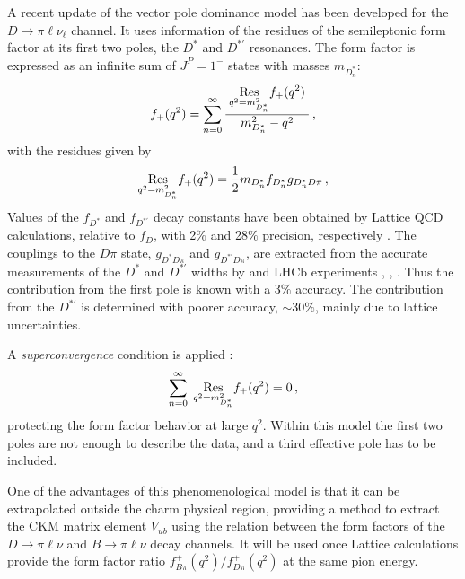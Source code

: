 A recent update of the vector pole dominance model has been developed for the $D \to \pi \ell \nu_\ell$ channel\cite{Becirevic:2014kaa}.
It uses information of the residues of the semileptonic form factor at its first two poles, the $D^\ast$ 
and $D^{\ast '}$ resonances.  
The form factor is expressed as an infinite sum of $J^P =1^-$ states with masses $m_{D^\ast_n}$: 
\begin{eqnarray}
f_+(q^2) = \sum_{n=0}^\infty { \; \displaystyle{\underset{q^2= m_{D^\ast_n}^2}{\rm Res}} f_+(q^2)\;\over m_{D^\ast_n}^2-q^2} \,,
\label{ThreePole}
\end{eqnarray}
with the residues given by 
\begin{eqnarray}
\displaystyle{\underset{q^2=m_{D_n^\ast}^2}{\rm Res}} f_+(q^2)= {1\over 2} m_{D_n^\ast} f_{D_n^\ast} g_{D_n^\ast D\pi}\,, 
\label{Residua}
\end{eqnarray}
Values of the $f_{D^\ast}$ and $f_{D^{\ast '}}$ decay constants have been obtained by Lattice QCD calculations, 
relative to $f_{D}$, with 2$\%$ and 28$\%$ precision, respectively \cite{Becirevic:2014kaa}. 
The couplings to the $D\pi$ state, $g_{D^\ast D\pi}$ and $g_{D^{\ast '} D\pi}$, are extracted from the accurate 
measurements of the $D^\ast$ and  $D^{\ast '}$ widths by \babar and LHCb experiments \cite{Lees:2013uxa}, \cite{delAmoSanchez:2010vq}, \cite{Aaij:2013sza}. 
Thus the contribution from the first pole is known with a $3\%$ accuracy. 
The contribution from the $D^{\ast '}$ is determined with poorer accuracy, $\sim 30\%$, mainly due to lattice uncertainties.   

A {\it superconvergence} condition is applied \cite{Burdman:1996kr}: 
\begin{eqnarray}
\sum_{n=0}^\infty { \; \displaystyle{\underset{q^2=m_{D^\ast_n}^2}{\rm Res}} f_+(q^2) }= 0 \,,
\label{superconvergence}
\end{eqnarray}
protecting the form factor behavior at large $q^2$.
Within this model the first two poles are not enough to describe the data, and a third effective pole has to be included. 

One of the advantages of this phenomenological model 
is that it can be extrapolated outside the charm physical region, providing a method to 
extract the CKM matrix element $V_{ub}$ using the relation between the form factors of the 
$D\to \pi\ell \nu$ and $B\to \pi\ell \nu$ decay channels. It will be used once Lattice calculations provide
the form factor ratio $f^{+}_{B\pi}(q^2)/f^{+}_{D\pi}(q^2)$ at the same pion energy. 

